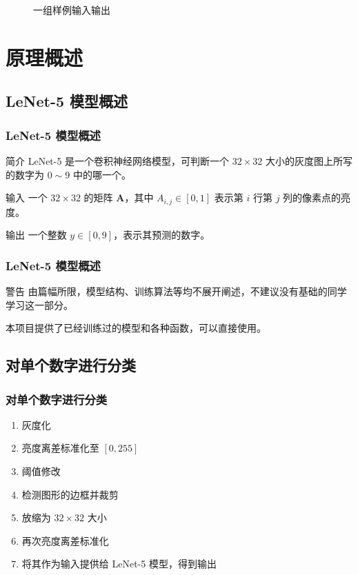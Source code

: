 \documentclass[10pt,aspectratio=43,serif]{beamer}
\begin{document}
\begin{frame}
\begin{figure}
        \caption{一组样例输入输出}
    \end{figure}
\end{frame}

\section{原理概述}
\subsection{LeNet-5 模型概述}
\begin{frame}
    \frametitle{LeNet-5 模型概述}
    \begin{block}{简介}
        LeNet-5 是一个卷积神经网络模型，可判断一个 $32 \times 32$ 大小的灰度图上所写的数字为 $0 \sim 9$ 中的哪一个。
    \end{block}
    
    \begin{block}{输入}
        一个 $32 \times 32$ 的矩阵 $\mathbf A$，其中 $A_{i, j} \in [0, 1]$ 表示第 $i$ 行第 $j$ 列的像素点的亮度。
    \end{block}
    
    \begin{block}{输出}
        一个整数 $y \in [0, 9]$，表示其预测的数字。
    \end{block}
\end{frame}

\begin{frame}
    \frametitle{LeNet-5 模型概述}
    \begin{alertblock}{警告}
        由篇幅所限，模型结构、训练算法等均不展开阐述，不建议没有基础的同学学习这一部分。
        
        本项目提供了已经训练过的模型和各种函数，可以直接使用。
    \end{alertblock}
\end{frame}

\subsection{对单个数字进行分类}
\begin{frame}
    \frametitle{对单个数字进行分类}
    \begin{enumerate}
        \item 灰度化
        \item 亮度离差标准化至 $[0, 255]$
        \item 阈值修改
        \item 检测图形的边框并裁剪
        \item 放缩为 $32 \times 32$ 大小
        \item 再次亮度离差标准化
        \item 将其作为输入提供给 LeNet-5 模型，得到输出
    \end{enumerate}
\end{frame}
\end{document}
